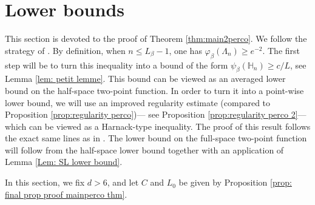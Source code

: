 \documentclass[11pt,a4paper]{article}
\numberwithin{equation}{section}
\theoremstyle{plain}
\theoremstyle{definition}
\begin{document}
\section{Lower bounds}\label{sec:lowerboundsperco}
This section is devoted to the proof of Theorem \ref{thm:main2perco}. We follow the strategy of \cite{DumPan24WSAW}. By definition, when $n\leq L_\beta-1$, one has $\varphi_\beta(\Lambda_n)\geq e^{-2}$. The first step will be to turn this inequality into a bound of the form $\psi_\beta(\mathbb H_n)\geq c/L$, see Lemma \ref{lem: petit lemme}. This bound can be viewed as an averaged lower bound on the half-space two-point function. In order to turn it into a point-wise lower bound, we will use an improved regularity estimate (compared to Proposition \ref{prop:regularity perco})--- see Proposition \ref{prop:regularity perco 2}--- which can be viewed as a Harnack-type inequality. The proof of this result follows the exact same lines as in \cite{DumPan24WSAW}. The lower bound on the full-space two-point function will follow from the half-space lower bound together with an application of Lemma \ref{Lem: SL lower bound}.

 In this section, we fix $d>6$, and let $C$ and $L_0$ be given by Proposition \ref{prop: final prop proof mainperco thm}. 
 
\end{document}
